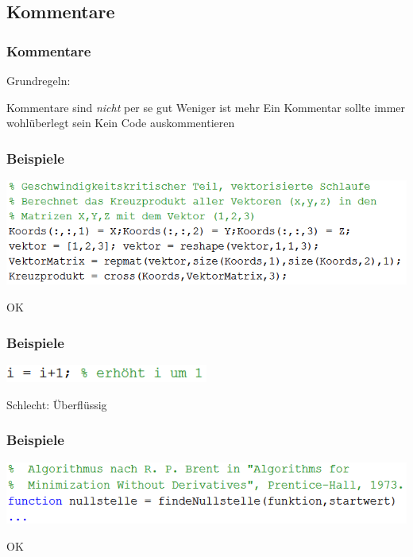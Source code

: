 \documentclass[handout]{beamer}
\begin{document}
\subsection{Kommentare}
\begin{frame}
    \frametitle{Kommentare}
    Grundregeln:

    \begin{outline}
        \pause
        \1 Kommentare sind \emph{nicht} per se gut
        \pause
        \1 Weniger ist mehr
        \pause
        \1 Ein Kommentar sollte immer wohlüberlegt sein
        \pause
        \1 Kein Code auskommentieren
    \end{outline}
\end{frame}
\begin{frame}
    \frametitle{Beispiele}
        \begin{center}
    \includegraphics[width=\textwidth]{pictures/Kommentare1.PNG}

    \pause
    \vspace{2em}
            \huge \color{green} OK
        \end{center}
\end{frame}
\begin{frame}
    \frametitle{Beispiele}
        \begin{center}
    \includegraphics[width=0.5\textwidth]{pictures/Kommentare3.PNG}

    \pause
    \vspace{2em}
            \huge \color{red} Schlecht: Überflüssig
        \end{center}
\end{frame}
\begin{frame}
    \frametitle{Beispiele}
        \begin{center}
    \includegraphics[width=\textwidth]{pictures/Kommentare2.PNG}

    \pause
    \vspace{2em}
            \huge \color{green} OK
        \end{center}
\end{frame}
\end{document}
